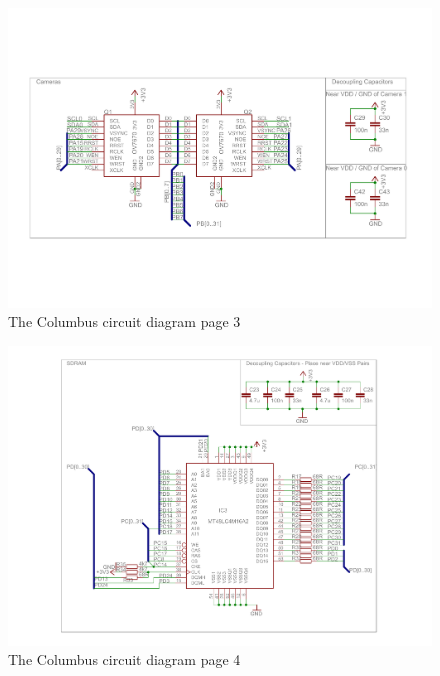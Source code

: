 \begin{figure}
\centering
\includegraphics[width=\textheight,keepaspectratio]{./Figures/ColumbusCircuitPage3.pdf}
\caption{The Columbus circuit diagram page 3}
\label{sch:Columbus_Schematic:3}
\end{figure}

\begin{figure}
\centering
\includegraphics[width=\textheight,keepaspectratio]{./Figures/ColumbusCircuitPage4.pdf}
\caption{The Columbus circuit diagram page 4}
\label{sch:Columbus_Schematic:4}
\end{figure}

